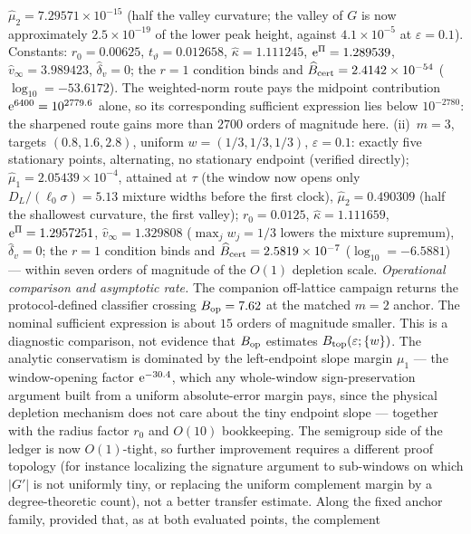 \begin{remark}
\(\widehat\mu_2=7.29571\times10^{-15}\) (half the valley curvature; the valley of \(G\) is now
approximately \(2.5\times10^{-19}\) of the lower peak height, against
\(4.1\times10^{-5}\) at \(\varepsilon=0.1\)).  Constants: \(r_0=0.00625\),
\(t_\vartheta=0.012658\), \(\hat\kappa=1.111245\),
\(\mathrm e^{\Pi}=1.289539\), \(\widehat v_\infty=3.989423\),
\(\widehat\delta_v=0\); the
\(r=1\) condition binds and
\(\widehat B_{\rm cert}=2.4142\times10^{-54}\)
(\(\log_{10}=-53.6172\)).  The weighted-norm route pays
the midpoint contribution \(\mathrm e^{6400}=10^{2779.6}\) alone, so its
corresponding sufficient expression lies below
\(10^{-2780}\): the sharpened route gains more than \(2700\) orders of
magnitude here.  (ii)~\(m=3\), targets \((0.8,1.6,2.8)\), uniform
\(w=(1/3,1/3,1/3)\), \(\varepsilon=0.1\): exactly five stationary points,
alternating, no stationary endpoint (verified directly);
\(\widehat\mu_1=2.05439\times10^{-4}\), attained at \(\tau\) (the window now opens
only \(D_L/(\ell_0\sigma)=5.13\) mixture widths before the first clock),
\(\widehat\mu_2=0.490309\) (half the shallowest curvature, the first valley);
\(r_0=0.0125\), \(\hat\kappa=1.111659\), \(\mathrm e^{\Pi}=1.2957251\),
\(\widehat v_\infty=1.329808\)
(\(\max_jw_j=1/3\) lowers the mixture supremum),
\(\widehat\delta_v=0\); the \(r=1\) condition binds and
\(\widehat B_{\rm cert}=2.5819\times10^{-7}\)
(\(\log_{10}=-6.5881\)) ---
within seven orders of magnitude of the \(O(1)\) depletion scale.
\emph{Operational comparison and asymptotic rate.}  The companion
off-lattice campaign returns the protocol-defined classifier crossing
\(B_{\rm op}=7.62\) at the matched \(m=2\) anchor.  The nominal sufficient
expression is about \(15\) orders of magnitude smaller.  This is a diagnostic
comparison, not evidence that \(B_{\rm op}\) estimates
\(B_{\rm top}(\varepsilon;\{w\})\).  The analytic conservatism is dominated
by the left-endpoint slope
margin \(\mu_1\) --- the window-opening factor \(\mathrm e^{-30.4}\), which any
whole-window sign-preservation argument built from a uniform absolute-error
margin pays,
since the physical depletion mechanism does not care about the tiny
endpoint slope --- together with the radius factor \(r_0\) and \(O(10)\)
bookkeeping.  The semigroup side of the ledger is now \(O(1)\)-tight, so
further improvement requires a different proof topology (for instance
localizing the signature argument to sub-windows on which \(|G'|\) is not
uniformly tiny, or replacing the uniform complement margin by a
degree-theoretic count), not a better transfer estimate.  Along the fixed
anchor family, provided that, as at both evaluated points, the complement

\end{remark}
